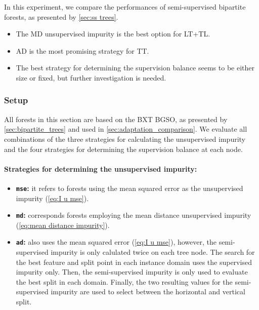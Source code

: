 In this experiment, we compare the performances of semi-supervised bipartite forests, as presented by \autoref{sec:ss trees}.

\begin{mdframed}[frametitle={Key findings}]
    \begin{itemize}
        \item The MD unsupervised impurity is the best option for LT+TL.
        \item AD is the most promising strategy for TT.
        \item The best strategy for determining the supervision balance seems to be either size or fixed, but further investigation is needed.
    \end{itemize}
\end{mdframed}

\subsubsection{Setup}

All forests in this section are based on the BXT BGSO, as presented by \autoref{sec:bipartite_trees} and used in \autoref{sec:adaptation_comparison}. We evaluate all combinations of the three strategies for calculating the unsupervised impurity and the four strategies for determining the supervision balance at each node.

\paragraph*{Strategies for determining the unsupervised impurity:}
\begin{itemize}
    \item \textbf{\texttt{mse}:} it refers to forests using the mean squared error as the unsupervised impurity (\autoref{eq:I u mse}).
    \item \textbf{\texttt{md}:} corresponds forests employing the mean distance unsupervised impurity (\autoref{eq:mean distance impurity}).
    \item \textbf{\texttt{ad}:} also uses the mean squared error (\autoref{eq:I u mse}), however, the semi-supervised impurity is only calulated twice on each tree node. The search for the best feature and split point in each instance domain uses the supervised impurity only. Then, the semi-supervised impurity is only used to evaluate the best split in each domain. Finally, the two resulting values for the semi-supervised impurity are used to select between the horizontal and vertical split.
\end{itemize}

